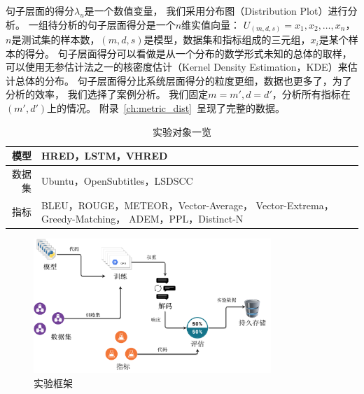 句子层面的得分$\lambda_u$是一个数值变量，
我们采用分布图（Distribution Plot）进行分析。
一组待分析的句子层面得分是一个$n$维实值向量： $U_{(m, d, s)} = x_1, x_2, \dots, x_n$，
$n$是测试集的样本数，$(m, d, s)$是模型，数据集和指标组成的三元组，$x_i$是某个样本的得分。
句子层面得分可以看做是从一个分布的数学形式未知的总体的取样，
可以使用无参估计法之一的核密度估计（Kernel Density Estimation，KDE）来估计总体的分布。
句子层面得分比系统层面得分的粒度更细，数据也更多了，为了分析的效率，
我们选择了案例分析。
我们固定$m = m', d = d'$，分析所有指标在$(m', d')$上的情况。
附录~\ref{ch:metric_dist}~呈现了完整的数据。

\begin{table}[H]
    \centering
    \caption{实验对象一览}
    \label{tab:experiment_triples}
    \begin{tabular}{|r|m{}|}
        \hline
        模型 & HRED，LSTM，VHRED \\
        \hline
        数据集 & Ubuntu，OpenSubtitles，LSDSCC \\
        \hline
        指标 & BLEU，ROUGE，METEOR，Vector-Average，
        Vector-Extrema，Greedy-Matching，
        ADEM，PPL，Distinct-N \\
        \hline
    \end{tabular}
\end{table}

\begin{figure}[H]
    \centering
    \includegraphics[width=0.8\textwidth]{figure/drawio/eval_v4.pdf}
    \caption{实验框架}
    \label{fig:framework}
\end{figure}

